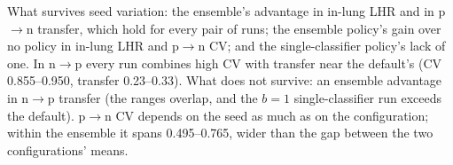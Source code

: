 What survives seed variation: the ensemble's advantage in in-lung LHR and in p$\to$n transfer, which hold for every pair of runs; the ensemble policy's gain over no policy in in-lung LHR and p$\to$n CV; and the single-classifier policy's lack of one. In n$\to$p every run combines high CV with transfer near the default's (CV 0.855--0.950, transfer 0.23--0.33). What does not survive: an ensemble advantage in n$\to$p transfer (the ranges overlap, and the $b=1$ single-classifier run exceeds the default). p$\to$n CV depends on the seed as much as on the configuration; within the ensemble it spans 0.495--0.765, wider than the gap between the two configurations' means.
